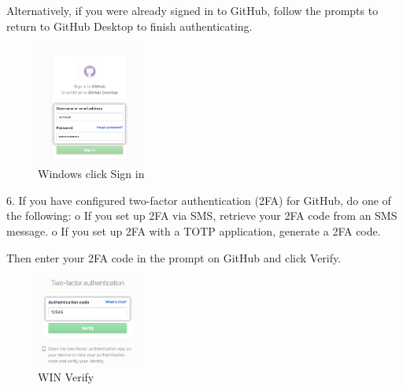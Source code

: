 Alternatively, if you were already signed in to GitHub, follow the prompts to return to GitHub Desktop to finish authenticating.
\begin{figure}[ht]
    \centering
    \includegraphics[width=0.3\textwidth]{figures/WIN click Sign in.png}
    \caption{Windows click Sign in }
\end{figure}
6.	If you have configured two-factor authentication (2FA) for GitHub, do one of the following:
o	If you set up 2FA via SMS, retrieve your 2FA code from an SMS message.
o	If you set up 2FA with a TOTP application, generate a 2FA code.

Then enter your 2FA code in the prompt on GitHub and click Verify.
 
\begin{figure}[ht]
    \centering
    \includegraphics[width=0.3\textwidth]{figures/WIN Verify.png}
    \caption{WIN Verify}
\end{figure}


